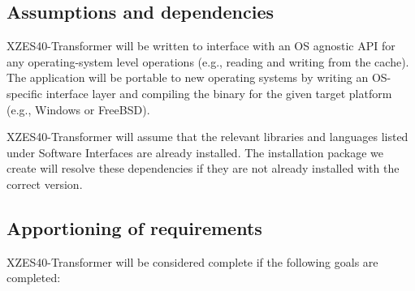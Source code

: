 \subsection{Assumptions and dependencies}

XZES40-Transformer will be written to interface with an OS agnostic API for any operating-system level operations (e.g., reading and writing from the cache).
The application will be portable to new operating systems by writing an OS-specific interface layer and compiling the binary for the given target platform (e.g., Windows or FreeBSD).

XZES40-Transformer will assume that the relevant libraries and languages listed under Software Interfaces are already installed.
The installation package we create will resolve these dependencies if they are not already installed with the correct version.


\subsection{Apportioning of requirements}

XZES40-Transformer will be considered complete if the following goals are completed:

